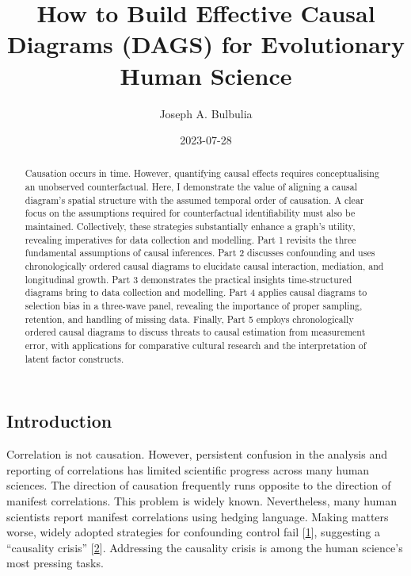 \documentclass[
  singlecolumn]{article}
\title{How to Build Effective Causal Diagrams (DAGS) for Evolutionary
Human Science}
\author{Joseph A. Bulbulia}
\affil{%
                  Victoria University of Wellington, New Zealand, School
                  of Psychology, Centre for Applied Cross-Cultural
                  Research
              }
\date{2023-07-28}
\begin{document}
\maketitle
\begin{abstract}
Causation occurs in time. However, quantifying causal effects requires
conceptualising an unobserved counterfactual. Here, I demonstrate the
value of aligning a causal diagram's spatial structure with the assumed
temporal order of causation. A clear focus on the assumptions required
for counterfactual identifiability must also be maintained.
Collectively, these strategies substantially enhance a graph's utility,
revealing imperatives for data collection and modelling. Part 1 revisits
the three fundamental assumptions of causal inferences. Part 2 discusses
confounding and uses chronologically ordered causal diagrams to
elucidate causal interaction, mediation, and longitudinal growth. Part 3
demonstrates the practical insights time-structured diagrams bring to
data collection and modelling. Part 4 applies causal diagrams to
selection bias in a three-wave panel, revealing the importance of proper
sampling, retention, and handling of missing data. Finally, Part 5
employs chronologically ordered causal diagrams to discuss threats to
causal estimation from measurement error, with applications for
comparative cultural research and the interpretation of latent factor
constructs.
\end{abstract}
\ifdefined\Shaded\renewenvironment{Shaded}{\begin{tcolorbox}[borderline west={3pt}{0pt}{shadecolor}, boxrule=0pt, interior hidden, breakable, enhanced, frame hidden, sharp corners]}{\end{tcolorbox}}\fi

\hypertarget{introduction}{%
\subsection{Introduction}\label{introduction}}

Correlation is not causation. However, persistent confusion in the
analysis and reporting of correlations has limited scientific progress
across many human sciences. The direction of causation frequently runs
opposite to the direction of manifest correlations. This problem is
widely known. Nevertheless, many human scientists report manifest
correlations using hedging language. Making matters worse, widely
adopted strategies for confounding control fail
{[}\protect\hyperlink{ref-mcelreath2020}{1}{]}, suggesting a ``causality
crisis'' {[}\protect\hyperlink{ref-bulbulia2022}{2}{]}. Addressing the
causality crisis is among the human science's most pressing tasks.
\end{document}
